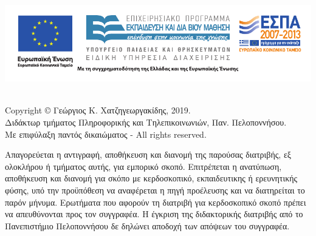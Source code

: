 \vspace{1ex}
\includegraphics[width=.95\textwidth]{Logo-irakleitos_GR}~\\
\noindent
{}


\newpage
\begin{minipage}{\textwidth}
\vspace{14cm}
\begin{center}
\justifying
Copyright \copyright{} Γεώργιος Κ. Χατζηγεωργακίδης, 2019.\\
Διδάκτωρ τμήματος Πληροφορικής και Τηλεπικοινωνιών, Παν. Πελοποννήσου.\\
Με επιφύλαξη παντός δικαιώματος - All rights reserved.
\end{center}
\begin{center}
\justifying
Απαγορεύεται η αντιγραφή, αποθήκευση και διανομή της παρούσας διατριβής, εξ ολοκλήρου ή τμήματος αυτής, για εμπορικό σκοπό. Επιτρέπεται η ανατύπωση, αποθήκευση και διανομή για σκόπο με κερδοσκοπικό, εκπαιδευτικης ή ερευνητικής φύσης, υπό την προϋπόθεση να αναφέρεται η πηγή προέλευσης και να διατηρείται το παρόν μήνυμα. Ερωτήματα που αφορούν τη διατριβή για κερδοσκοπικό σκοπό πρέπει να απευθύνονται προς τον συγγραφέα. Η έγκριση της διδακτορικής διατριβής από το Πανεπιστήμιο Πελοποννήσου δε δηλώνει αποδοχή των απόψεων του συγγραφέα.
\end{center}
\end{minipage}